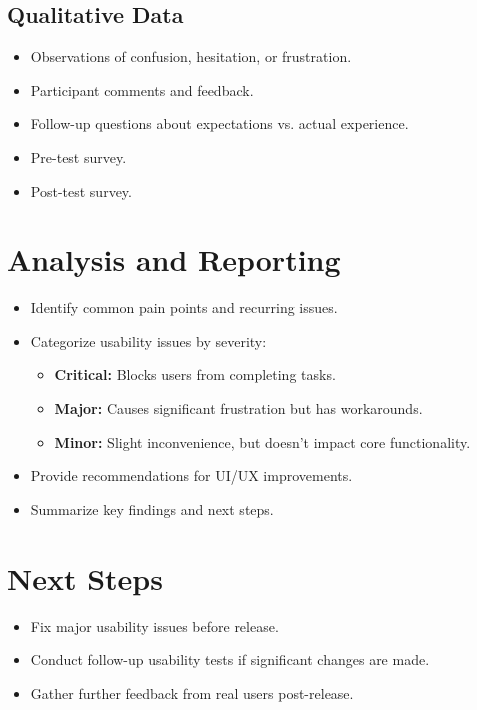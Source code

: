 \documentclass[12pt, titlepage]{article}
\begin{document}
\subsection*{Qualitative Data}
\begin{itemize}
  \item Observations of confusion, hesitation, or frustration.
  \item Participant comments and feedback.
  \item Follow-up questions about expectations vs. actual experience.
  \item Pre-test survey.
  \item Post-test survey.
\end{itemize}

\section*{Analysis and Reporting}
\begin{itemize}
  \item Identify common pain points and recurring issues.
  \item Categorize usability issues by severity:
    \begin{itemize}
      \item \textbf{Critical:} Blocks users from completing tasks.
      \item \textbf{Major:} Causes significant frustration but has workarounds.
      \item \textbf{Minor:} Slight inconvenience, but doesn’t impact
        core functionality.
    \end{itemize}
  \item Provide recommendations for UI/UX improvements.
  \item Summarize key findings and next steps.
\end{itemize}

\section*{Next Steps}
\begin{itemize}
  \item Fix major usability issues before release.
  \item Conduct follow-up usability tests if significant changes are made.
  \item Gather further feedback from real users post-release.
\end{itemize}
\end{document}
